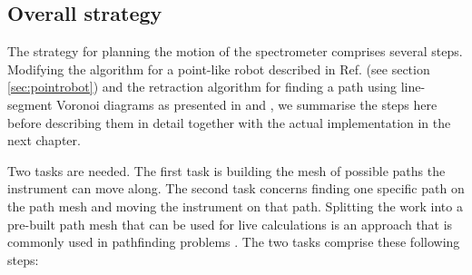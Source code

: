 \subsection{Overall strategy}
\label{sec:strategy}

The strategy for planning the motion of the spectrometer comprises several steps. 
Modifying the algorithm for a point-like robot described in Ref. 
\cite[Ch. 13, pp. 283-306]{Berg2008} (see section \ref{sec:pointrobot}) and the 
retraction algorithm for finding a path using line-segment Voronoi diagrams as 
presented in \cite[p. 163]{Berg2008} and \cite[Ch. 5.4.3, pp. 247-251]{FUH_geo2020}, we
summarise the steps here before describing them in detail together with the actual
implementation in the next chapter.

Two tasks are needed. The first task is building the mesh of possible paths the 
instrument can move along. 
The second task concerns finding one specific path on the path mesh and moving
the instrument on that path. 
Splitting the work into a pre-built path mesh that can be used for live calculations
is an approach that is commonly used in pathfinding problems \cite{Hwang2003, Choset2010_ch5}.
The two tasks comprise these following steps:
